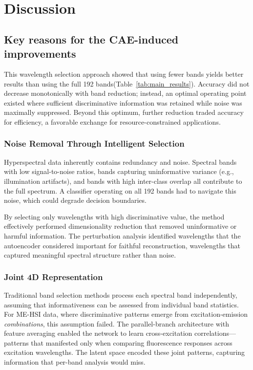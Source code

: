 \section{Discussion}
\label{sec:discussion}

\subsection{Key reasons for the CAE-induced improvements}
\label{sec:discussion_why}

This wavelength selection approach showed that using fewer bands yields better results than using the full 192 bands(Table~\ref{tab:main_results}). Accuracy did not decrease monotonically with band reduction; instead, an optimal operating point existed where sufficient discriminative information was retained while noise was maximally suppressed.
Beyond this optimum, further reduction traded accuracy for efficiency, a favorable exchange for resource-constrained applications.

\subsubsection{Noise Removal Through Intelligent Selection}
Hyperspectral data inherently contains redundancy and noise.
Spectral bands with low signal-to-noise ratios, bands capturing uninformative variance (e.g., illumination artifacts), and bands with high inter-class overlap all contribute to the full spectrum.
A classifier operating on all 192 bands had to navigate this noise, which could degrade decision boundaries.

By selecting only wavelengths with high discriminative value, the method effectively performed dimensionality reduction that removed uninformative or harmful information.
The perturbation analysis identified wavelengths that the autoencoder considered important for faithful reconstruction, wavelengths that captured meaningful spectral structure rather than noise.

\subsubsection{Joint 4D Representation}
Traditional band selection methods process each spectral band independently, assuming that informativeness can be assessed from individual band statistics.
For ME-HSI data, where discriminative patterns emerge from excitation-emission \emph{combinations}, this assumption failed.
The parallel-branch architecture with feature averaging enabled the network to learn cross-excitation correlations---patterns that manifested only when comparing fluorescence responses across excitation wavelengths.
The latent space encoded these joint patterns, capturing information that per-band analysis would miss.

